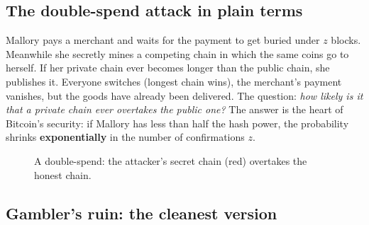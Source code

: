 \documentclass[11pt,a4paper]{article}
\newenvironment{plainenglish}{\par\smallskip}{\par\smallskip}
\theoremstyle{definition}
\theoremstyle{plain}
\theoremstyle{remark}
\begin{document}
\subsection{The double-spend attack in plain terms}

\begin{plainenglish}
Mallory pays a merchant and waits for the payment to get buried under $z$ blocks. Meanwhile she secretly mines a competing chain in which the same coins go to herself. If her private chain ever becomes
longer than the public chain, she publishes it. Everyone switches (longest chain wins), the merchant's payment vanishes, but the goods have already been delivered. The question: \emph{how likely is
it that a private chain ever overtakes the public one?} The answer is the heart of Bitcoin's security: if Mallory has less than half the hash power, the probability shrinks \textbf{exponentially} in the number of confirmations $z$.
\end{plainenglish}

\begin{figure}[htbp]
\centering
{}
\caption{A double-spend: the attacker's secret chain (red) overtakes the honest chain.}
\end{figure}

\subsection{Gambler's ruin: the cleanest version}
\end{document}
